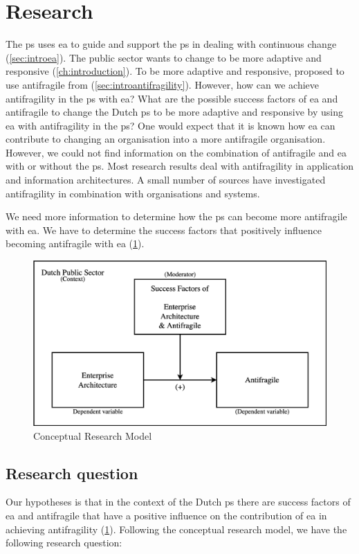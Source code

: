 \section{Research}
\label{sec:research}
The \gls{ps} uses \acrlong{ea} to guide and support the \gls{ps} in dealing with continuous change (\cref{sec:introea}). The public sector wants to change to be more adaptive and responsive (\cref{ch:introduction}). To be more adaptive and responsive, \textcite{Steen2018} proposed to use \gls{antifragile} from \textcite{Taleb2012} (\cref{sec:introantifragility}). However, how can we achieve \gls{antifragility} in the \gls{ps} with \acrlong{ea}? What are the possible success factors of \acrlong{ea} and \gls{antifragile} to change the Dutch \gls{ps} to be more adaptive and responsive by using \acrlong{ea} with \gls{antifragility} in the \gls{ps}? One would expect that it is known how \acrlong{ea} can contribute to changing an organisation into a more \gls{antifragile} organisation. However, we could not find information on the combination of \gls{antifragile} and \acrlong{ea} with or without the \gls{ps}. Most research results deal with \gls{antifragility} in application and information architectures. A small number of sources have investigated \gls{antifragility} in combination with organisations and systems. 

We need more information to determine how the \gls{ps} can become more \gls{antifragile} with \acrlong{ea}. We have to determine the success factors that positively influence becoming \gls{antifragile} with \acrlong{ea} (\cref{fig:conceptualmodel}).
\begin{figure}[H]
	\centering
	\includegraphics[width=0.7\linewidth]{images/conceptualmodel}
	\caption[Conceptual Research Model]{Conceptual Research Model}
	\label{fig:conceptualmodel}
\end{figure}

\subsection{Research question}
\label{sub:introresearchquestion}
Our hypotheses is that in the context of the Dutch \gls{ps} there are success factors of \acrlong{ea} and \gls{antifragile} that have a positive influence on the contribution of \acrlong{ea} in achieving \gls{antifragility} (\cref{fig:conceptualmodel}). Following the conceptual research model, we have the following research question:

